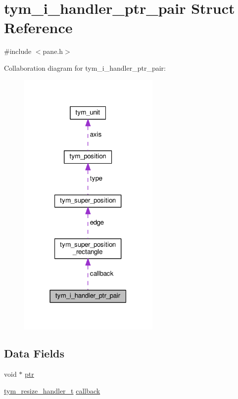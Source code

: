\hypertarget{structtym__i__handler__ptr__pair}{}\section{tym\+\_\+i\+\_\+handler\+\_\+ptr\+\_\+pair Struct Reference}
\label{structtym__i__handler__ptr__pair}


{\ttfamily \#include $<$pane.\+h$>$}



Collaboration diagram for tym\+\_\+i\+\_\+handler\+\_\+ptr\+\_\+pair\+:
\nopagebreak
\begin{figure}[H]
\begin{center}
\leavevmode
\includegraphics[width=195pt]{structtym__i__handler__ptr__pair__coll__graph}
\end{center}
\end{figure}
\subsection*{Data Fields}
\begin{DoxyCompactItemize}
\item 
void $\ast$ \hyperlink{structtym__i__handler__ptr__pair_a9cc2f422ffb3ed953f009d03ca5477bb}{ptr}
\item 
\hyperlink{libttymultiplex_8h_a7b785cb846faa92e5f2f5fbf32bdcde4}{tym\+\_\+resize\+\_\+handler\+\_\+t} \hyperlink{structtym__i__handler__ptr__pair_a2e8f24a33817fd8af89b9279f252fc8d}{callback}
\end{DoxyCompactItemize}


